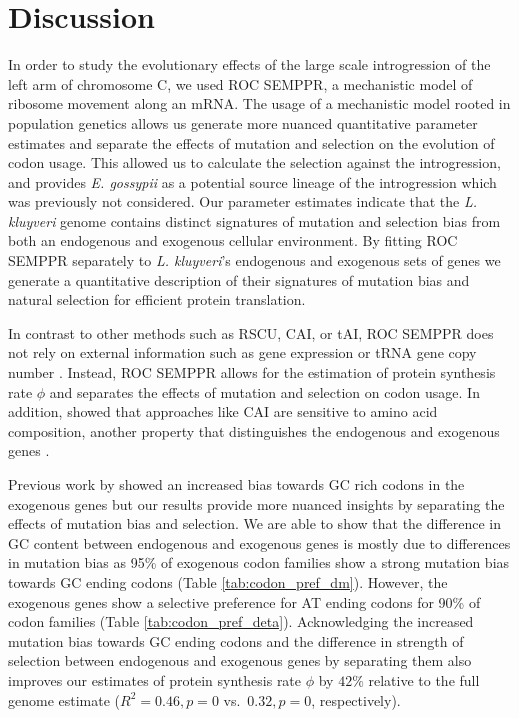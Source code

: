 \documentclass[doublespacing,linenumbers]{bmcart}
\newcommand{\kluyveri}{\textit{L. kluyveri}\xspace}
\newcommand{\gossypii}{\textit{E. gossypii}\xspace}
\newcommand{\ROC}{ROC SEMPPR\xspace}
\newcommand{\GC}{GC content\xspace}
\begin{document}
\section*{Discussion}
In order to study the evolutionary effects of the large scale introgression of the left arm of chromosome C, we used \ROC, a mechanistic model of ribosome movement along an mRNA.
The usage of a mechanistic model rooted in population genetics allows us generate more nuanced quantitative parameter estimates and separate the effects of mutation and selection on the evolution of codon usage.
This allowed us to calculate the selection against the introgression, and provides \gossypii as a potential source lineage of the introgression which was previously not considered.
Our parameter estimates indicate that the \kluyveri genome contains distinct signatures of mutation and selection bias from both an endogenous and exogenous cellular environment.
By fitting \ROC separately to \kluyveri's endogenous and exogenous sets of genes we generate a quantitative description of their signatures of mutation bias and natural selection for efficient protein translation.

In contrast to other methods such as RSCU, CAI, or tAI, \ROC does not rely on external information such as gene expression or tRNA gene copy number \cite{sharp1987, dosreis2004}.
Instead, \ROC allows for the estimation of protein synthesis rate $\phi$ and separates the effects of mutation and selection on codon usage.
In addition, \cite{cope2018} showed that approaches like CAI are sensitive to amino acid composition, another property that distinguishes the endogenous and exogenous genes \cite{payen2009}.

Previous work by \cite{payen2009} showed an increased bias towards GC rich codons in the exogenous genes but our results provide more nuanced insights by separating the effects of mutation bias and selection.
We are able to show that the difference in \GC between endogenous and exogenous genes is mostly due to differences in mutation bias as 95\% of exogenous codon families show a strong mutation bias towards GC ending codons (Table \ref{tab:codon_pref_dm}).
However, the exogenous genes show a selective preference for AT ending codons for 90\% of codon families (Table \ref{tab:codon_pref_deta}).
Acknowledging the increased mutation bias towards GC ending codons and the difference in strength of selection between endogenous and exogenous genes by separating them also improves our estimates of protein synthesis rate $\phi$ by $42 \%$ relative to the full genome estimate ($R^2 = 0.46, p = 0$ vs.~$0.32, p = 0$, respectively).
\end{document}
